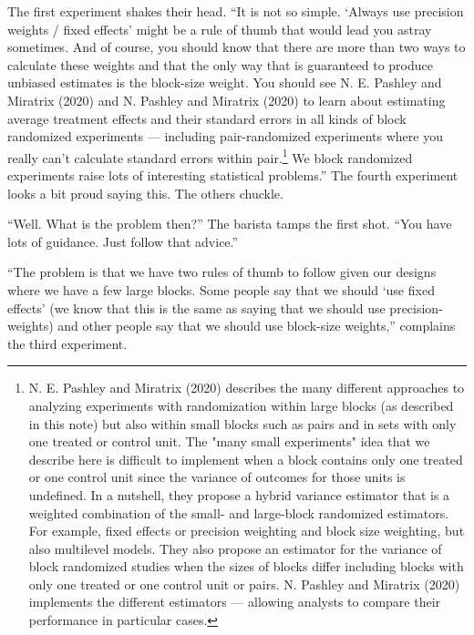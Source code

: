 \documentclass[
]{article}
\begin{document}
The first experiment shakes their head. ``It is not so simple. `Always use precision weights / fixed effects' might be a rule of thumb that would lead you astray sometimes. And of course, you should know that there are more than two ways to calculate
these weights and that the only way that is guaranteed to produce unbiased
estimates is the block-size weight. You should see N. E. Pashley and Miratrix (2020) and
N. Pashley and Miratrix (2020) to learn about estimating average treatment effects and
their standard errors in all kinds of block randomized experiments ---
including pair-randomized experiments where you really can't calculate standard
errors within pair.\footnote{N. E. Pashley and Miratrix (2020) describes the many different
  approaches to analyzing experiments with randomization within large blocks (as
  described in this note) but also within small blocks such as pairs and in sets
  with only one treated or control unit. The "many small experiments" idea that
  we describe here is difficult to implement when a block contains only one
  treated or one control unit since the variance of outcomes for those units is
  undefined. In a nutshell, they propose a hybrid variance estimator that is a
  weighted combination of the small- and large-block randomized estimators. For
  example, fixed effects or precision weighting and block size weighting, but
  also multilevel models. They also propose an estimator for the variance of
  block randomized studies when the sizes of blocks differ including blocks with
  only one treated or one control unit or pairs. N. Pashley and Miratrix (2020) implements
  the different estimators --- allowing analysts to compare their performance in
  particular cases.} We block randomized experiments raise lots of interesting
statistical problems.'' The fourth experiment looks a bit proud saying this. The
others chuckle.

``Well. What is the problem then?'' The barista tamps the first shot. ``You have
lots of guidance. Just follow that advice.''

``The problem is that we have two rules of thumb to follow given our designs
where we have a few large blocks. Some people say that we should `use fixed
effects' (we know that this is the same as saying that we should use
precision-weights) and other people say that we should use block-size weights,''
complains the third experiment.
\end{document}
